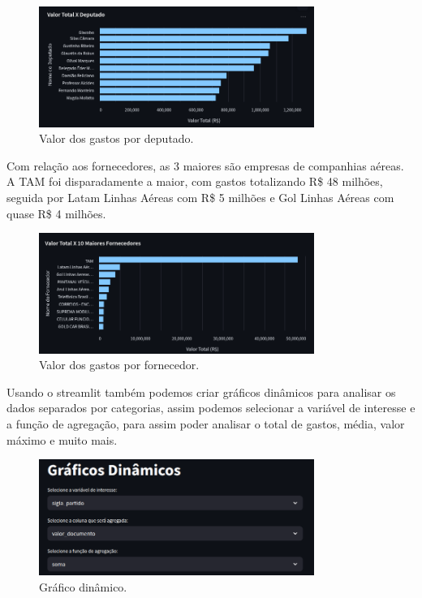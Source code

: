 \documentclass[12pt, a4paper]{article}
\begin{document}
\begin{figure}[!htbp]
	\centering
	\includegraphics[width=0.8\textwidth]{assets/2_plot3.png}
	\caption{Valor dos gastos por deputado.}
	\label{fig:criacao_postgresql}
\end{figure}

Com relação aos fornecedores, as 3 maiores são empresas de companhias aéreas. A TAM foi disparadamente a maior, com gastos totalizando R\$ 48 milhões, seguida por Latam Linhas Aéreas com R\$ 5 milhões e Gol Linhas Aéreas com quase R\$ 4 milhões.

\begin{figure}[!htbp]
	\centering
	\includegraphics[width=0.8\textwidth]{assets/2_plot4.png}
	\caption{Valor dos gastos por fornecedor.}
	\label{fig:criacao_postgresql}
\end{figure}

Usando o streamlit também podemos criar gráficos dinâmicos para analisar os dados separados por categorias, assim podemos selecionar a variável de interesse e a função de agregação, para assim poder analisar o total de gastos, média, valor máximo e muito mais.

\begin{figure}[!htbp]
	\centering
	\includegraphics[width=0.8\textwidth]{assets/2_plot5.png}
	\caption{Gráfico dinâmico.}
	\label{fig:criacao_postgresql}
\end{figure}
\newpage
\end{document}
